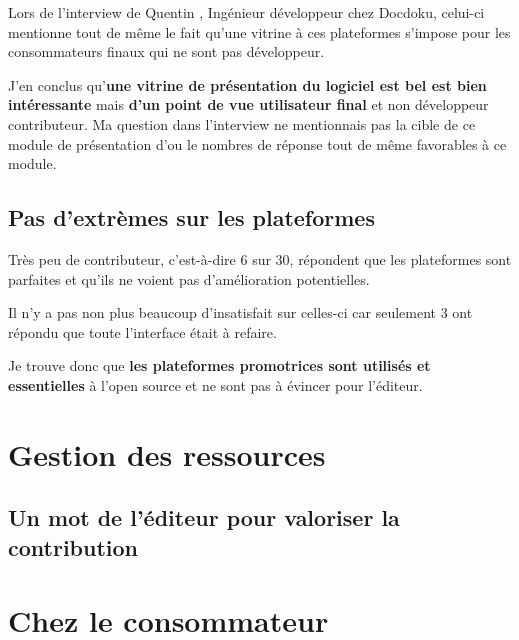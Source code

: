 			Lors de l'interview de Quentin , Ingénieur développeur chez Docdoku, celui-ci mentionne tout de même le fait qu'une vitrine à ces plateformes s'impose pour les consommateurs finaux qui ne sont pas développeur.

			\begin{center}
				\textit{
				}
			\end{center}

			J'en conclus qu'\textbf{une vitrine de présentation du logiciel est bel est bien intéressante} mais \textbf{d'un point de vue utilisateur final} et non développeur contributeur. Ma question dans l'interview ne mentionnais pas la cible de ce module de présentation d'ou le nombres de réponse tout de même favorables à ce module.

		\subsection{Pas d'extrèmes sur les plateformes}

			Très peu de contributeur, c'est-à-dire 6 sur 30, répondent que les plateformes sont parfaites et qu'ils ne voient pas d'amélioration potentielles.

			Il n'y a pas non plus beaucoup d'insatisfait sur celles-ci car seulement 3 ont répondu que toute l'interface était à refaire.

			Je trouve donc que \textbf{les plateformes promotrices sont utilisés et essentielles} à l'open source et ne sont pas à évincer pour l'éditeur.

		\newpage

	\section{Gestion des ressources}

		\subsection{Un mot de l'éditeur pour valoriser la contribution}



		\newpage
	\section{Chez le consommateur}

